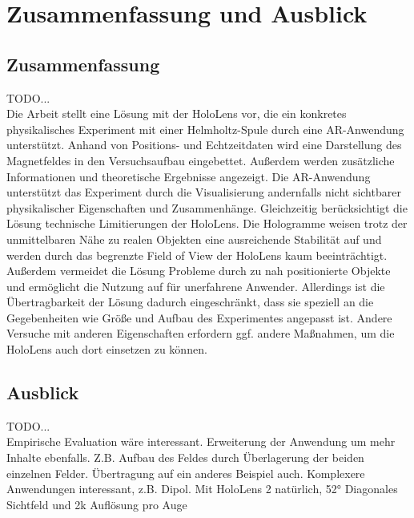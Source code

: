 \section{Zusammenfassung und Ausblick}
\label{sec-7}

\subsection{Zusammenfassung}
TODO...\\
Die Arbeit stellt eine Lösung mit der HoloLens vor, die ein konkretes physikalisches Experiment mit einer Helmholtz-Spule durch eine AR-Anwendung unterstützt. Anhand von Positions- und Echtzeitdaten wird eine Darstellung des Magnetfeldes in den Versuchsaufbau eingebettet. Außerdem werden zusätzliche Informationen und theoretische Ergebnisse angezeigt. Die AR-Anwendung unterstützt das Experiment durch die Visualisierung andernfalls nicht sichtbarer physikalischer Eigenschaften und Zusammenhänge. Gleichzeitig berücksichtigt die Lösung technische Limitierungen der HoloLens. Die Hologramme weisen trotz der unmittelbaren Nähe zu realen Objekten eine ausreichende Stabilität auf und werden durch das begrenzte Field of View der HoloLens kaum beeinträchtigt. Außerdem vermeidet die Lösung Probleme durch zu nah positionierte Objekte und ermöglicht die Nutzung auf für unerfahrene Anwender. Allerdings ist die Übertragbarkeit der Lösung dadurch eingeschränkt, dass sie speziell an die Gegebenheiten wie Größe und Aufbau des Experimentes angepasst ist. Andere Versuche mit anderen Eigenschaften erfordern ggf. andere Maßnahmen, um die HoloLens auch dort einsetzen zu können.

\subsection{Ausblick}
TODO...\\
Empirische Evaluation wäre interessant. Erweiterung der Anwendung um mehr Inhalte ebenfalls. Z.B. Aufbau des Feldes durch Überlagerung der beiden einzelnen Felder. Übertragung auf ein anderes Beispiel auch. Komplexere Anwendungen interessant, z.B. Dipol. Mit HoloLens 2 natürlich, 52° Diagonales Sichtfeld und 2k Auflösung pro Auge